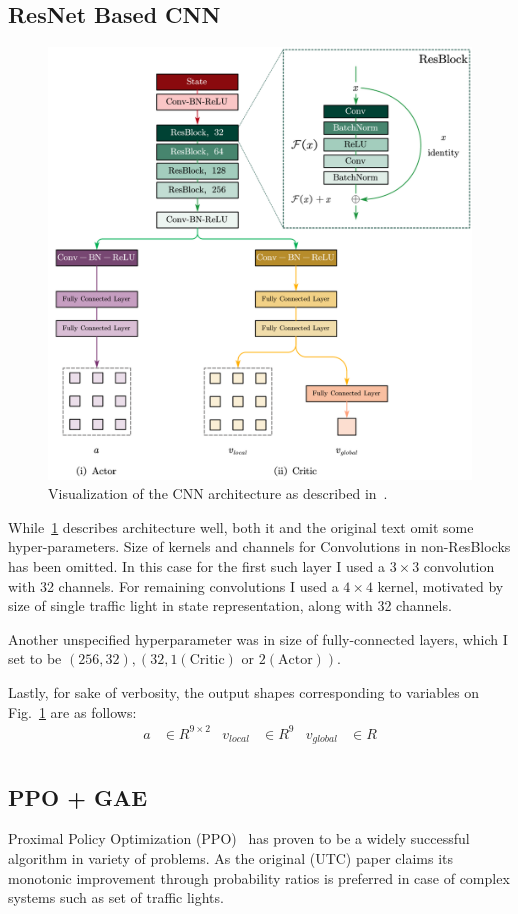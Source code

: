 \documentclass{article}
\begin{document}
    \subsection{ResNet Based CNN}
    \begin{figure}[h]
        \centering
        \includegraphics[width=0.4\linewidth]{figs/cnn.png}
        \caption{
            Visualization of the CNN architecture as described in~\cite{utc}.
        }
        \label{fig:cnn}
    \end{figure}

    While~\ref{fig:cnn} describes architecture well, both it and the original text omit some hyper-parameters.
    Size of kernels and channels for Convolutions in non-ResBlocks has been omitted.
    In this case for the first such layer I used a $3\times3$ convolution with 32 channels.
    For remaining convolutions I used a $4\times4$ kernel, motivated by size of single traffic light in state representation,
    along with 32 channels.

    Another unspecified hyperparameter was in size of fully-connected layers, which I set to be $(256, 32), (32, 1 (\text{Critic}) \text{ or } 2 (\text{Actor}))$.

    Lastly, for sake of verbosity, the output shapes corresponding to variables on Fig.~\ref{fig:cnn} are as follows:
    \begin{align*}
        a &\in R^{9\times2} &
        v_{local} &\in R^{9} &
        v_{global} &\in R \\
    \end{align*}

    \subsection{PPO + GAE}
    Proximal Policy Optimization (PPO)~\cite{ppo} has proven to be a widely successful algorithm in variety of problems.
    As the original (UTC) paper claims its monotonic improvement through probability ratios is preferred in case of complex systems
    such as set of traffic lights.
\end{document}
